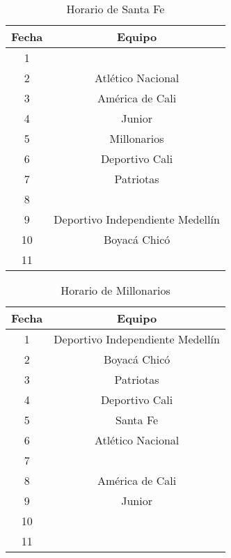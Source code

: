 \documentclass[11pt]{article}
\begin{document}
\begin{multicols}{2}
            \begin{table}[H]
                \centering
                \begin{tabular}{|c||c|}
                    \hline
                    Fecha & Equipo\\ \hline
                    1 &  \\ \hline
                    2 & Atlético Nacional \\ \hline
                    3 & América de Cali \\ \hline
                    4 & Junior \\ \hline
                    5 & Millonarios \\ \hline
                    6 & Deportivo Cali \\ \hline
                    7 & Patriotas \\ \hline
                    8 &  \\ \hline
                    9 & Deportivo Independiente Medellín \\ \hline
                    10 & Boyacá Chicó \\ \hline
                    11 &  \\ \hline
                \end{tabular} 
                \caption{Horario de Santa Fe}
            \end{table}

            \begin{table}[H]
                \centering
                \begin{tabular}{|c||c|}
                    \hline
                    Fecha & Equipo\\ \hline
                    1 & Deportivo Independiente Medellín \\ \hline
                    2 & Boyacá Chicó \\ \hline
                    3 & Patriotas \\ \hline
                    4 & Deportivo Cali \\ \hline
                    5 & Santa Fe \\ \hline
                    6 & Atlético Nacional \\ \hline
                    7 &  \\ \hline
                    8 & América de Cali \\ \hline
                    9 & Junior \\ \hline
                    10 &  \\ \hline
                    11 &  \\ \hline
                \end{tabular} 
                \caption{Horario de Millonarios}
            \end{table}


\end{multicols}
\end{document}
